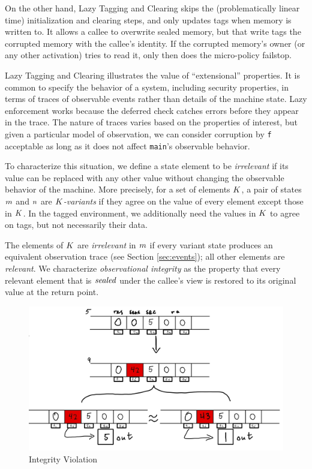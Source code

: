 \documentclass[10pt,conference]{ieeetran}%
\theoremstyle{definition}
\begin{document}
On the other hand, Lazy Tagging and Clearing skips the (problematically linear time)
initialization and clearing steps, and only updates tags when memory is written to.
It allows a callee to overwrite sealed memory, but that write tags the corrupted memory
with the callee's identity. If the corrupted memory's owner (or any other activation) tries
to read it, only then does the micro-policy failstop.

Lazy Tagging and Clearing illustrates the value of ``extensional'' properties.
It is common to specify the behavior of a system, including security properties, in
terms of traces of observable events rather than details of the machine state.
Lazy enforcement works because the deferred check catches errors before they appear
in the trace. The nature of traces varies based on the properties of interest, but
given a particular model of observation, we can consider
corruption by {\tt f} acceptable as long as it does not affect {\tt main}'s observable behavior.

To characterize this situation, we define a state element to be \emph{irrelevant}
if its value can be replaced with any other value without changing the observable behavior
of the machine. More precisely, for a set of elements \(K\),
a pair of states \(m\) and \(n\) are {\em \(K\)-variants} if they
agree on the value of every element except those in \(K\).
In the tagged environment, we additionally need the values in \(K\)
to agree on tags, but not necessarily their data.

The elements of \(K\) are \emph{irrelevant}
in \(m\) if every variant state produces an equivalent observation trace
(see Section \ref{sec:events}); all other elements are \emph{relevant}.
We characterize \emph{observational integrity} as the property that
every relevant element that is \(\mathit{sealed}\) under the callee's view is restored
to its original value at the return point.

\begin{figure}
  \includegraphics[width=\columnwidth]{variants.png}
  \caption{Integrity Violation}
  \label{fig:variant}
\end{figure}
\end{document}
